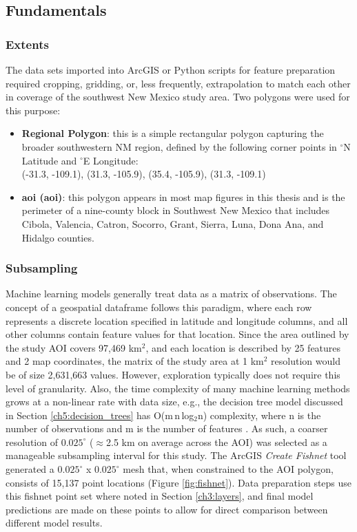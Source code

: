 \subsection{Fundamentals}

\subsubsection{Extents}

The data sets imported into ArcGIS or Python scripts for feature preparation required cropping, gridding, or, less frequently, extrapolation to match each other in coverage of the southwest New Mexico study area. Two polygons were used for this purpose:

\begin{itemize}
\item \textbf{Regional Polygon}: this is a simple rectangular polygon capturing the broader southwestern NM region, defined by the following corner points in $^\circ$N Latitude and $^\circ$E Longitude: \\ (-31.3, -109.1), (31.3, -105.9), (35.4, -105.9), (31.3, -109.1)
\item \textbf{\acrlong{aoi} (\acrshort{aoi})}: this polygon appears in most map figures in this thesis and is the perimeter of a nine-county block in Southwest New Mexico that includes Cibola, Valencia, Catron, Socorro, Grant, Sierra, Luna, Dona Ana, and Hidalgo counties.
\end{itemize}

\subsubsection{Subsampling}\label{ssn:fishnet}

Machine learning models generally treat data as a matrix of observations. The concept of a geospatial dataframe follows this paradigm, where each row represents a discrete location specified in latitude and longitude columns, and all other columns contain feature values for that location. Since the area outlined by the study AOI covers 97,469 km$^2$, and each location is described by 25 features and 2 map coordinates, the matrix of the study area at 1 km$^2$ resolution would be of size 2,631,663 values. However, exploration typically does not require this level of granularity. Also, the time complexity of many machine learning methods grows at a non-linear rate with data size, e.g., the decision tree model discussed in Section \ref{ch5:decision_trees} has O(m\,n\,log$_{2}$n) complexity, where n is the number of observations and m is the number of features \citep{sani_computational_2018}. As such, a coarser resolution of $0.025^\circ$ ($\approx$2.5 km on average across the AOI) was selected as a manageable subsampling interval for this study. The ArcGIS \textit{Create Fishnet} tool generated a $0.025^\circ$ x $0.025^\circ$ mesh that, when constrained to the AOI polygon, consists of 15,137 point locations (Figure \ref{fig:fishnet}). Data preparation steps use this fishnet point set where noted in Section \ref{ch3:layers}, and final model predictions are made on these points to allow for direct comparison between different model results. 

